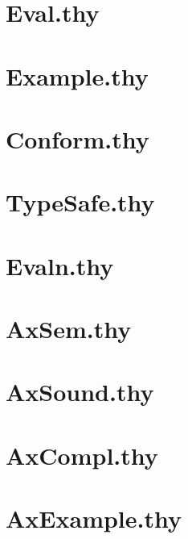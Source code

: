 \documentclass[11pt,a4paper]{book}
\begin{document}
\chapter{Eval.thy}
          

\chapter{Example.thy}
  

\chapter{Conform.thy}
       
\chapter{TypeSafe.thy}


\chapter{Evaln.thy}
         
\chapter{AxSem.thy}
      
\chapter{AxSound.thy}
    
\chapter{AxCompl.thy}
    
\chapter{AxExample.thy}
  







%
%
\end{document}
